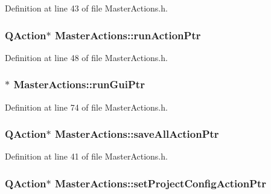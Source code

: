 Definition at line 43 of file Master\-Actions.\-h.

\hypertarget{class_master_actions_a3377fe0ddc45ce50119766c8a903c039}{
\subsubsection[{run\-Action\-Ptr}]{\setlength{\rightskip}{0pt plus 5cm}Q\-Action$\ast$ Master\-Actions\-::run\-Action\-Ptr\hspace{0.3cm}{\ttfamily [private]}}}\label{class_master_actions_a3377fe0ddc45ce50119766c8a903c039}


Definition at line 48 of file Master\-Actions.\-h.

\hypertarget{class_master_actions_ad7ff295f2e3067697e290afc4f0fd0df}{
\subsubsection[{run\-Gui\-Ptr}]{$\ast$ Master\-Actions\-::run\-Gui\-Ptr\hspace{0.3cm}{\ttfamily [private]}}}\label{class_master_actions_ad7ff295f2e3067697e290afc4f0fd0df}


Definition at line 74 of file Master\-Actions.\-h.

\hypertarget{class_master_actions_a4e9bf6410023b508d56f235903a44b5f}{
\subsubsection[{save\-All\-Action\-Ptr}]{\setlength{\rightskip}{0pt plus 5cm}Q\-Action$\ast$ Master\-Actions\-::save\-All\-Action\-Ptr\hspace{0.3cm}{\ttfamily [private]}}}\label{class_master_actions_a4e9bf6410023b508d56f235903a44b5f}


Definition at line 41 of file Master\-Actions.\-h.

\hypertarget{class_master_actions_abe52f232f77f5a5bff35c8e3dadb3d80}{
\subsubsection[{set\-Project\-Config\-Action\-Ptr}]{\setlength{\rightskip}{0pt plus 5cm}Q\-Action$\ast$ Master\-Actions\-::set\-Project\-Config\-Action\-Ptr\hspace{0.3cm}{\ttfamily [private]}}}\label{class_master_actions_abe52f232f77f5a5bff35c8e3dadb3d80}


